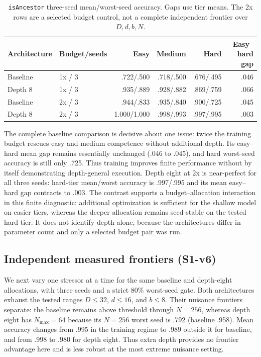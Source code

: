 \documentclass[10pt]{article}
\begin{document}
\begin{table}[H]\centering\small
\begin{tabular}{llrrrr}
\toprule
Architecture & Budget/seeds & Easy & Medium & Hard & Easy--hard gap\\
\midrule
Baseline & 1x / 3 & .722/.500 & .718/.500 & .676/.495 & .046\\
Depth 8 & 1x / 3 & .935/.889 & .928/.882 & .869/.759 & .066\\
Baseline & 2x / 3 & .944/.833 & .935/.840 & .900/.725 & .045\\
Depth 8 & 2x / 3 & 1.000/1.000 & .998/.993 & .997/.995 & .003\\
\bottomrule
\end{tabular}
\caption{\texttt{isAncestor} three-seed mean/worst-seed accuracy. Gaps use tier means. The 2x rows are a selected budget control, not a complete independent frontier over $D,d,b,N$.}\label{tab:capacity-budget}
\end{table}

The complete baseline comparison is decisive about one issue: twice the training budget rescues easy and medium competence without additional depth. Its easy--hard mean gap remains essentially unchanged (.046 to .045), and hard worst-seed accuracy is still only .725. Thus training improves finite performance without by itself demonstrating depth-general execution. Depth eight at 2x is near-perfect for all three seeds: hard-tier mean/worst accuracy is .997/.995 and its mean easy--hard gap contracts to .003. The contrast supports a budget--allocation interaction in this finite diagnostic: additional optimization is sufficient for the shallow model on easier tiers, whereas the deeper allocation remains seed-stable on the tested hard tier. It does not identify depth alone, because the architectures differ in parameter count and only a selected budget pair was run.

\subsection{Independent measured frontiers (S1-v6)}
We next vary one stressor at a time for the same baseline and depth-eight allocations, with three seeds and a strict 80\% worst-seed gate. Both architectures exhaust the tested ranges $D\le32$, $d\le16$, and $b\le8$. Their nuisance frontiers separate: the baseline remains above threshold through $N=256$, whereas depth eight has $N_{\max}=64$ because its $N=256$ worst seed is .792 (baseline .958). Mean accuracy changes from .995 in the training regime to .989 outside it for baseline, and from .998 to .980 for depth eight. Thus extra depth provides no frontier advantage here and is less robust at the most extreme nuisance setting.
\end{document}
